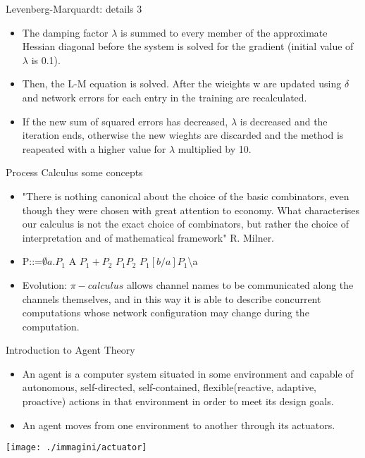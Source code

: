 \begin{frame}{Levenberg-Marquardt: details 3}
\begin{itemize}
\item The damping factor $\lambda$ is summed to every member of the approximate Hessian diagonal before the system is solved for the gradient (initial value of $\lambda$ is 0.1).
\item Then, the L-M equation is solved. After the wieights w are updated using $\delta$ and network errors for each entry in the training are recalculated.
\item If the new sum of squared errors has decreased, $\lambda$ is decreased and the iteration ends, otherwise the new wieghts are discarded and the method is reapeated with a higher value for $\lambda$ multiplied by 10.
\end{itemize}
\end{frame}
\begin{frame}{Process Calculus some concepts}
\begin{itemize}
\item<1->"There is nothing canonical about the choice of the basic combinators, even though they were chosen with great attention to economy. What characterises our calculus is not the exact choice of combinators, but rather the choice of interpretation and of mathematical framework"  R. Milner.\\
\item<2->{\color{redUnicam}{CCS: Calculus of Comunicating Systems}}
\begin{center}
P::=$\emptyset $\textbar $a.P_{1}$ \textbar A \textbar $ P_{1} + P_{2} $ \textbar  $P_{1}$\textbar$P_{2}$ \textbar$ P_{1}[b/a] $\textbar $P_{1}$\textbackslash a
\end{center}
\item<3->Evolution: $\pi-calculus$ allows channel names to be communicated along the channels themselves, and in this way it is able to describe concurrent computations whose network configuration may change during the computation.
\end{itemize}
\end{frame}
\begin{frame}{Introduction to Agent Theory}
\begin{itemize}
\item An agent is a computer system situated in some environment and capable of autonomous, self-directed, self-contained, flexible(reactive, adaptive, proactive) actions in that environment in order to meet its design goals. 
\item An agent moves from one environment to another through its actuators. 
\end{itemize}
\begin{center}
\texttt{[image: ./immagini/actuator]}
\end{center}
\end{frame}
